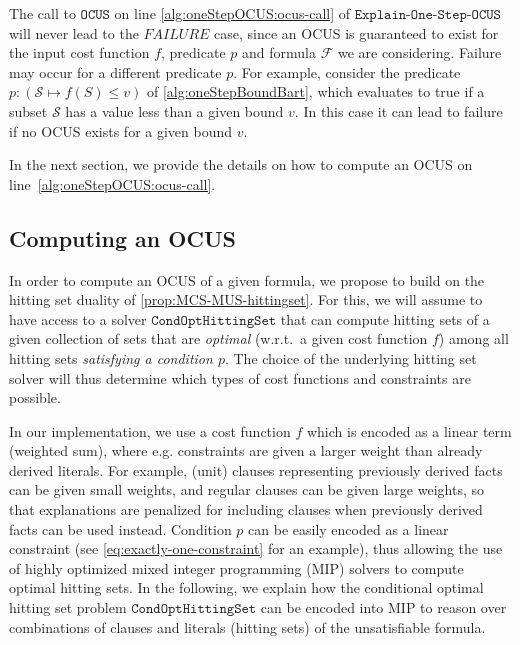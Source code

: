 \documentclass[twoside,11pt]{article}
\newcommand\m[1]{\mathcal{#1}}
\newtheorem{proposition}[propo]{Proposition}
\newcommand\comment[1]{\marginpar{\tiny #1}}
\renewcommand\comment[1]{#1}
\newcommand{\emilio}[1]{{\comment{\color{red}Emilio: #1}}}
\newcommand{\newtext}[1]{{\comment{{\color{blue} #1}}}}
\newcommand\formula{\ensuremath{\m{F} }\xspace}
\newcommand\mm[1]{\ensuremath{#1}\xspace}
\newcommand\call[1]{\mm{\texttt{#1}}}
\newcommand\cohs{\mm{\call{CondOptHittingSet}}}
\newcommand\comus{\mm{\call{OCUS}}}
\newcommand\mcses[1]{\ensuremath{\mathit{MCSs}(#1)}\xspace}
\newcommand\onestepo{\ensuremath{\call{Explain-One-Step-OCUS}}\xspace}
\begin{document}
The call to \comus on line \ref{alg:oneStepOCUS:ocus-call} of \onestepo will never lead to the $\mathit{FAILURE}$ case, since an OCUS is guaranteed to exist for the input cost function $f$, predicate $p$ and formula $\formula$ we are considering. Failure may occur for a different predicate $p$. For example, consider the predicate $p: (\m{S} \mapsto f(S) \leq v)$ of \cref{alg:oneStepBoundBart}, which evaluates to true if a subset $\m{S}$ has a value less than a given bound $v$. In this case it can lead to failure if no OCUS exists for a given bound $v$.  

In the next section, we provide the details on how to compute an OCUS on line~\ref{alg:oneStepOCUS:ocus-call}.

\subsection{Computing an OCUS}\label{sec:computing_an_ocus}

In order to compute an OCUS of a given formula, we propose to build on the hitting set duality of \cref{prop:MCS-MUS-hittingset}. 
For this, we will assume to have access to a solver \cohs that can compute hitting sets of a given collection of sets that are \emph{optimal} (w.r.t.~a given cost function $f$) among all hitting sets \emph{satisfying a condition $p$}. 
The choice of the underlying hitting set solver will thus determine which types of cost functions and constraints are possible. 


In our implementation, we use a cost function $f$ which is encoded as a linear term (weighted sum), where e.g. constraints are given a larger weight than already derived literals. 
For example, (unit) clauses representing previously derived facts can be given small weights, and regular clauses can be given large weights, so that explanations are penalized for including clauses when previously derived facts can be used instead.
Condition $p$ can be easily encoded as a linear constraint (see \cref{eq:exactly-one-constraint} for an example), 
thus allowing the use of highly optimized mixed integer programming (MIP) solvers to compute optimal hitting sets. 
In the following, we explain how the conditional optimal hitting set problem \cohs can be encoded into MIP to reason over combinations of clauses and literals (hitting sets) of the unsatisfiable formula.
\end{document}
